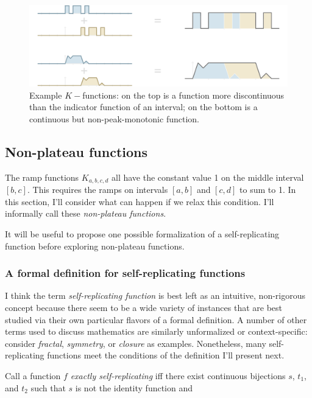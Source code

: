 \documentclass[20pt,]{extarticle}
\begin{document}
\begin{figure}[htbp]
\centering
\includegraphics{images/pdfs/other_ramps2.pdf}
\caption{\label{fig:other_ramps}Example \(K-\)functions: on the top is a
function more discontinuous than the indicator function of an interval;
on the bottom is a continuous but non-peak-monotonic
function.}\label{fig:otherux5framps}
\end{figure}

\subsection{Non-plateau functions}\label{non-plateau-functions}

The ramp functions \(K_{a,b,c,d}\) all have the constant value 1 on the
middle interval \([b, c]\). This requires the ramps on intervals
\([a, b]\) and \([c, d]\) to sum to 1. In this section, I'll consider
what can happen if we relax this condition. I'll informally call these
\emph{non-plateau functions}.

It will be useful to propose one possible formalization of a
self-replicating function before exploring non-plateau functions.

\subsubsection{A formal definition for self-replicating
functions}\label{a-formal-definition-for-self-replicating-functions}

I think the term \emph{self-replicating function} is best left as an
intuitive, non-rigorous concept because there seem to be a wide variety
of instances that are best studied via their own particular flavors of a
formal definition. A number of other terms used to discuss mathematics
are similarly unformalized or context-specific: consider \emph{fractal},
\emph{symmetry}, or \emph{closure} as examples. Nonetheless, many
self-replicating functions meet the conditions of the definition I'll
present next.

Call a function \(f\) \emph{exactly self-replicating} iff there exist
continuous bijections \(s\), \(t_1\), and \(t_2\) such that \(s\) is not
the identity function and
\end{document}
